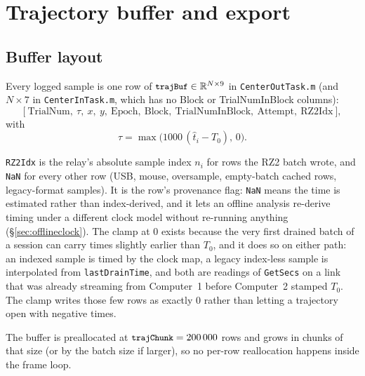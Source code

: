 \documentclass[11pt,a4paper]{article}
\newcommand{\code}[1]{\texttt{\small #1}}
\newcommand{\file}[1]{\texttt{\small #1}}
\begin{document}
\section{Trajectory buffer and export}
\label{sec:buffer}

\subsection{Buffer layout}

Every logged sample is one row of $\code{trajBuf} \in \mathbb{R}^{N \times 9}$
in \file{CenterOutTask.m} (and $N \times 7$ in \file{CenterInTask.m}, which has
no Block or TrialNumInBlock columns):
\begin{equation}
  \big[\ \text{TrialNum},\ \tau,\ x,\ y,\ \text{Epoch},\ \text{Block},\
  \text{TrialNumInBlock},\ \text{Attempt},\ \text{RZ2Idx}\ \big],
  \label{eq:row}
\end{equation}
with
\begin{equation}
  \tau = \max\!\big(1000\,(\hat t_i - T_0),\, 0\big).
  \label{eq:tau}
\end{equation}

\code{RZ2Idx} is the relay's absolute sample index $n_i$ for rows the RZ2 batch
wrote, and \code{NaN} for every other row (USB, mouse, oversample, empty-batch
cached rows, legacy-format samples). It is the row's provenance flag:
\code{NaN} means the time is estimated rather than index-derived, and it lets an
offline analysis re-derive timing under a different clock model without
re-running anything (\S\ref{sec:offlineclock}). The clamp at 0 exists because
the very first drained batch of a session can carry times slightly earlier than
$T_0$, and it does so on either path: an indexed sample is timed by the clock
map, a legacy index-less sample is interpolated from \code{lastDrainTime}, and
both are readings of \code{GetSecs} on a link that was already streaming from
Computer~1 before Computer~2 stamped $T_0$. The clamp writes those few rows as
exactly 0 rather than letting a trajectory open with negative times.

The buffer is preallocated at $\code{trajChunk} = 200\,000$ rows and grows in
chunks of that size (or by the batch size if larger), so no per-row
reallocation happens inside the frame loop.
\end{document}
